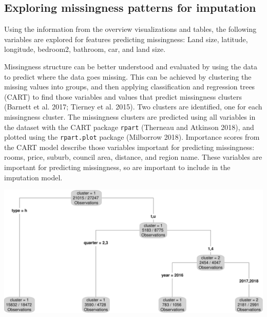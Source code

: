 \documentclass[]{article}
\let\origfigure\figure
\let\endorigfigure\endfigure
\renewenvironment{figure}[1][2] {
    \expandafter\origfigure\expandafter[H]
} {
    \endorigfigure
}
\theoremstyle{definition}
\theoremstyle{definition}
\theoremstyle{definition}
\theoremstyle{remark}
\begin{document}
\hypertarget{case-study-explore-for-imp}{%
\subsection{Exploring missingness patterns for
imputation}\label{case-study-explore-for-imp}}

Using the information from the overview visualizations and tables, the
following variables are explored for features predicting missingness:
Land size, latitude, longitude, bedroom2, bathroom, car, and land size.

Missingness structure can be better understood and evaluated by using
the data to predict where the data goes missing. This can be achieved by
clustering the missing values into groups, and then applying
classification and regression trees (CART) to find those variables and
values that predict missingness clusters (Barnett et al. 2017; Tierney
et al. 2015). Two clusters are identified, one for each missingness
cluster. The missingness clusters are predicted using all variables in
the dataset with the CART package \texttt{rpart} (Therneau and Atkinson
2018), and plotted using the \texttt{rpart.plot} package (Milborrow
2018). Importance scores from the CART model describe those variables
important for predicting missingness: rooms, price, suburb, council
area, distance, and region name. These variables are important for
predicting missingness, so are important to include in the imputation
model.

\begin{figure}

{\centering \includegraphics[width=1\linewidth]{tidy-missing-data-paper_files/figure-latex/rpart-plot-1} 

}

\caption{Decision tree output predicting the clusters of missingness. Type of house, the year quarter, and year were important for predicting missingness cluster. The cluster with the most missingness was for quarters 1 and 4, for 2017 and 2018. Type of house, year, and year quarter are important features related to the missingness structure.}\label{fig:rpart-plot}
\end{figure}
\end{document}
